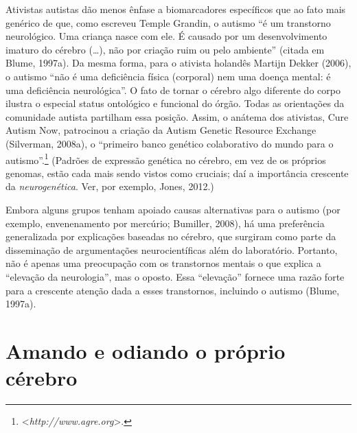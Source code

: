 Ativistas autistas dão menos ênfase a biomarcadores específicos que ao
fato mais genérico de que, como escreveu Temple Grandin, o autismo ``é
um transtorno neurológico. Uma criança nasce com ele. É causado por um
desenvolvimento imaturo do cérebro (\ldots{}), não por criação ruim ou pelo
ambiente'' (citada em Blume, 1997a). Da mesma forma, para o ativista
holandês Martijn Dekker (2006), o autismo ``não é uma deficiência física
(corporal) nem uma doença mental: é uma deficiência neurológica''. O
fato de tornar o cérebro algo diferente do corpo ilustra o especial
status ontológico e funcional do órgão. Todas as orientações da
comunidade autista partilham essa posição. Assim, o anátema
dos ativistas, Cure Autism Now, patrocinou a criação da Autism
Genetic Resource Exchange (Silverman, 2008a), o ``primeiro banco
genético colaborativo do mundo para o autismo''.\footnote[20]{\textless{}\emph{http://www.agre.org}\textgreater{}.}
(Padrões de expressão genética no cérebro, em vez de os próprios
genomas, estão cada mais sendo vistos como cruciais; daí a importância
crescente da \emph{neurogenética}. Ver, por exemplo, Jones, 2012.)

Embora alguns grupos tenham apoiado causas alternativas para o autismo
(por exemplo, envenenamento por mercúrio; Bumiller, 2008), há uma
preferência generalizada por explicações baseadas no cérebro, que
surgiram como parte da disseminação de argumentações neurocientíficas
além do laboratório. Portanto, não é apenas uma preocupação com os
transtornos mentais o que explica a ``elevação da neurologia'', mas o
oposto. Essa ``elevação'' fornece uma razão forte para a crescente
atenção dada a esses transtornos, incluindo o autismo (Blume, 1997a).

\section{Amando e odiando o próprio cérebro}

